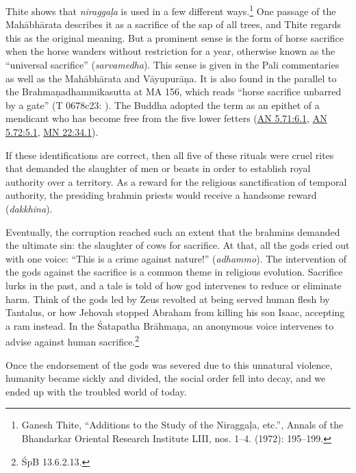 \documentclass[12pt,openany]{book}%
\newcommand*{\langlzh}[1]{\cjk{#1}\normalfont}%
\begin{document}
Thite shows that \textit{\textsanskrit{niraggaḷa}} is used in a few different ways.\footnote{Ganesh Thite, “Additions to the Study of the \textsanskrit{Niraggaḷa}, etc.”, Annals of the Bhandarkar Oriental Research Institute LIII, nos. 1–4. (1972): 195–199. } One passage of the \textsanskrit{Mahābhārata} describes it as a sacrifice of the sap of all trees, and Thite regards this as the original meaning. But a prominent sense is the form of horse sacrifice when the horse wanders without restriction for a year, otherwise known as the “universal sacrifice” (\textit{sarvamedha}). This sense is given in the Pali commentaries as well as the \textsanskrit{Mahābhārata} and \textsanskrit{Vāyupurāṇa}. It is also found in the parallel to the \textsanskrit{Brahmaṇadhammikasutta} at MA 156, which reads “horse sacrifice unbarred by a gate” (T 0678c23: \langlzh{馬齋不障門}). The Buddha adopted the term as an epithet of a mendicant who has become free from the five lower fetters (\href{https://suttacentral.net/an5.71/en/sujato\#6.1}{AN 5.71:6.1}, \href{https://suttacentral.net/an5.72/en/sujato\#5.1}{AN 5.72:5.1}, \href{https://suttacentral.net/mn22.34/en/sujato\#1}{MN 22:34.1}).

If these identifications are correct, then all five of these rituals were cruel rites that demanded the slaughter of men or beasts in order to establish royal authority over a territory. As a reward for the religious sanctification of temporal authority, the presiding brahmin priests would receive a handsome reward (\textit{dakkhina}).


Eventually, the corruption reached such an extent that the brahmins demanded the ultimate sin: the slaughter of cows for sacrifice. At that, all the gods cried out with one voice: “This is a crime against nature!” (\textit{adhammo}). The intervention of the gods against the sacrifice is a common theme in religious evolution. Sacrifice lurks in the past, and a tale is told of how god intervenes to reduce or eliminate harm. Think of the gods led by Zeus revolted at being served human flesh by Tantalus, or how Jehovah stopped Abraham from killing his son Isaac, accepting a ram instead. In the Śatapatha \textsanskrit{Brāhmaṇa}, an anonymous voice intervenes to advise against human sacrifice.\footnote{ŚpB 13.6.2.13. }

Once the endorsement of the gods was severed due to this unnatural violence, humanity became sickly and divided, the social order fell into decay, and we ended up with the troubled world of today.
\end{document}
